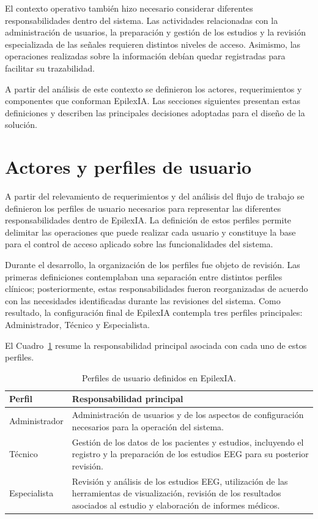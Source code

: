 El contexto operativo también hizo necesario considerar diferentes
responsabilidades dentro del sistema. Las actividades relacionadas con la
administración de usuarios, la preparación y gestión de los estudios y la
revisión especializada de las señales requieren distintos niveles de acceso.
Asimismo, las operaciones realizadas sobre la información debían quedar
registradas para facilitar su trazabilidad.

A partir del análisis de este contexto se definieron los actores, requerimientos
y componentes que conforman EpilexIA. Las secciones siguientes presentan estas
definiciones y describen las principales decisiones adoptadas para el diseño de
la solución.

\section{Actores y perfiles de usuario}
\label{sec:actores-perfiles}

A partir del relevamiento de requerimientos y del análisis del flujo de trabajo
se definieron los perfiles de usuario necesarios para representar las
diferentes responsabilidades dentro de EpilexIA. La definición de estos
perfiles permite delimitar las operaciones que puede realizar cada usuario y
constituye la base para el control de acceso aplicado sobre las funcionalidades
del sistema.

Durante el desarrollo, la organización de los perfiles fue objeto de revisión.
Las primeras definiciones contemplaban una separación entre distintos perfiles
clínicos; posteriormente, estas responsabilidades fueron reorganizadas de
acuerdo con las necesidades identificadas durante las revisiones del sistema.
Como resultado, la configuración final de EpilexIA contempla tres perfiles
principales: Administrador, Técnico y Especialista.

El Cuadro~\ref{tab:perfiles-usuario} resume la responsabilidad principal
asociada con cada uno de estos perfiles.

\begin{table}[H]
    \centering
    \caption{Perfiles de usuario definidos en EpilexIA.}
    \label{tab:perfiles-usuario}
    \begin{tabular}{|p{}|p{}|}
        \hline
        \textbf{Perfil} & \textbf{Responsabilidad principal} \\
        \hline
        Administrador &
        Administración de usuarios y de los aspectos de configuración
        necesarios para la operación del sistema. \\
        \hline
        Técnico &
        Gestión de los datos de los pacientes y estudios,
        incluyendo el registro y la preparación de los estudios EEG para su
        posterior revisión. \\
        \hline
        Especialista &
        Revisión y análisis de los estudios EEG, utilización de las
        herramientas de visualización, revisión de los resultados asociados
        al estudio y elaboración de informes médicos. \\
        \hline
    \end{tabular}
\end{table}

